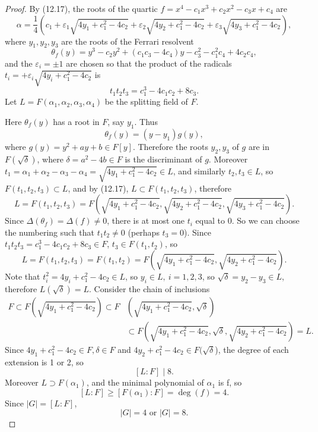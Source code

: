\documentclass[11pt,a4paper]{article}
\begin{document}
\begin{proof}
By (12.17), the roots of the quartic $f =x^4 -c_1x^3 + c_2 x^2 - c_3x + c_4$ are
$$\alpha = \frac{1}{4}\left ( c_1 + \varepsilon_1 \sqrt{ 4y_1 + c_1^2 - 4 c_2} + \varepsilon_2 \sqrt{ 4y_2 + c_1^2 - 4 c_2} + \varepsilon_3 \sqrt{ 4y_3 + c_1^2 - 4 c_2}\right ),$$
where $y_1,y_2,y_3$ are the roots of the Ferrari resolvent 
$$\theta_f(y) = y^3 - c_2y^2+(c_1c_3-4c_4) y - c_3^2 -c_1^2c_4 + 4 c_2c_4,$$
and the $\varepsilon_i = \pm 1$ are chosen so that the product of the radicals $t_i = + \varepsilon_i \sqrt{ 4y_i + c_1^2 - 4 c_2}$ is
$$t_1t_2t_3 = c_1^3 - 4 c_1 c_2 + 8c_3.$$
Let $L = F(\alpha_1,\alpha_2,\alpha_3,\alpha_4)$ be the splitting field of $F$.

Here $\theta_f(y)$ has a root in $F$, say $y_1$. Thus
$$\theta_f(y) =(y-y_1)g(y),$$
where $g(y) = y^2 + a y +b \in F[y].$
Therefore the roots $y_2,y_3$ of $g$ are in $F(\sqrt{\delta})$, where $\delta = a^2 - 4b \in F$ is the discriminant of $g$.
Moreover $t_1 = \alpha_1+\alpha_2-\alpha_3-\alpha_4  = \sqrt{ 4y_1 + c_1^2 - 4 c_2} \in L$, and similarly $t_2,t_3 \in L$, so $F(t_1,t_2,t_3) \subset L$, and by (12.17), $L \subset F(t_1,t_2,t_3)$, therefore
$$L = F(t_1,t_2,t_3) = F\left(\sqrt{ 4y_1 + c_1^2 - 4 c_2}, \sqrt{ 4y_2 + c_1^2 - 4 c_2},\sqrt{ 4y_3 + c_1^2 - 4 c_2}\right).$$
Since $\Delta(\theta_f) = \Delta(f) \ne 0$, there is at most one $t_i$ equal to $0$. So we can choose the numbering such that $t_1t_2 \ne 0$ (perhaps $t_3 = 0$). Since $t_1t_2t_3 = c_1^3 - 4 c_1 c_2 + 8c_3 \in F$, $t_3 \in F(t_1,t_2)$, so
$$L = F(t_1,t_2,t_3) = F(t_1,t_2) =F\left(\sqrt{ 4y_1 + c_1^2 - 4 c_2}, \sqrt{ 4y_2 + c_1^2 - 4 c_2}\right).$$
Note that $t_i^2 = 4y_i + c_1^2 - 4 c_2 \in L$, so $y_i \in L,\  i = 1,2,3$, so  $\sqrt{\delta} = y_2- y_3 \in L$, therefore $L(\sqrt{\delta}) = L$.
Consider the chain of inclusions
\begin{align*}
F \subset F\left(\sqrt{4y_1+c_1^2-4c_2}\right) \subset  F&\left(\sqrt{4y_1+c_1^2-4c_2},\sqrt{\delta}\right)\\
& \subset F\left(\sqrt{4y_1+c_1^2-4c_2}, \sqrt{\delta},\sqrt{4y_2+c_1^2-4c_2} \right) =L.
\end{align*}
 Since $4y_1+c_1^2-4c_2 \in F, \delta \in F$ and $4y_2+c_1^2-4c_2 \in F(\sqrt{\delta}$), the degree of each extension is 1 or 2, so 
$$[L:F] \mid 8.$$
Moreover $L \supset F(\alpha_1)$, and the minimal polynomial of $\alpha_1$ is f, so $$[L:F] \geq [F(\alpha_1):F] = \deg(f) = 4.$$ Since $|G| = [L:F]$,
$$|G| = 4 \text{ or } |G| = 8.$$
\end{proof}
\end{document}
